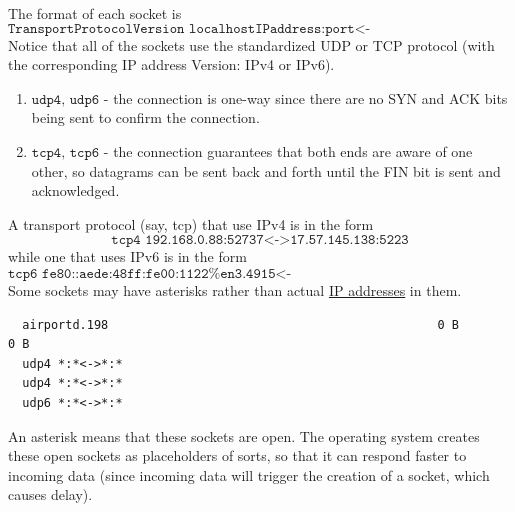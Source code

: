\documentclass{article}
\begin{document}
  The format of each socket is
  \begin{equation}
    \texttt{TransportProtocolVersion localhostIPaddress:port<->remoteIPaddress:port}
  \end{equation}
  Notice that all of the sockets use the standardized UDP or TCP protocol (with the corresponding IP address Version: IPv4 or IPv6). 
  \begin{enumerate}
      \item $\texttt{udp4, udp6}$ - the connection is one-way since there are no SYN and ACK bits being sent to confirm the connection. 
      \item $\texttt{tcp4, tcp6}$ - the connection guarantees that both ends are aware of one other, so datagrams can be sent back and forth until the FIN bit is sent and acknowledged. 
  \end{enumerate}
  A transport protocol (say, tcp) that use IPv4 is in the form
  \begin{equation}
    \texttt{tcp4 192.168.0.88:52737<->17.57.145.138:5223}
  \end{equation}
  while one that uses IPv6 is in the form 
  \begin{equation}
    \texttt{tcp6 fe80::aede:48ff:fe00:1122\%en3.4915<->fe80::aede:48ff:fe33:445\%en3.5960}
  \end{equation}
  Some sockets may have asterisks rather than actual \hyperref[def:ip-addresses]{IP addresses} in them. 
  \begin{lstlisting}
  airportd.198                                              0 B        0 B
  udp4 *:*<->*:*
  udp4 *:*<->*:*
  udp6 *:*<->*:*
  \end{lstlisting}
  An asterisk means that these sockets are open. The operating system creates these open sockets as placeholders of sorts, so that it can respond faster to incoming data (since incoming data will trigger the creation of a socket, which causes delay). 
\end{document}
